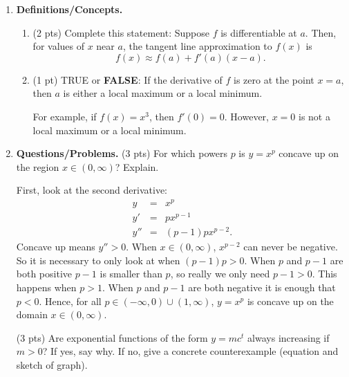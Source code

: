 \documentclass[11pt,letterpaper]{article}
\begin{document}
\begin{enumerate}
\item \textbf{Definitions/Concepts.} 
\begin{enumerate}
 \item (2 pts) Complete this statement:  Suppose $f$ is differentiable at $a$.  Then, for values of $x$ near $a$, the tangent line approximation to $f(x)$ is
\[f(x)\approx f(a)+f'(a)(x-a).\]
 
\vspace{1pc}
\item (1 pt) TRUE or \textbf{FALSE}: If the derivative of $f$ is zero at the point $x=a$, then $a$ is either a local maximum or a local minimum.

\vspace{.5pc}
For example, if $f(x)=x^3$, then $f'(0)=0$.  However, $x=0$ is not a local maximum or a local minimum.
\end{enumerate}

\vspace{1pc}
\item \textbf{Questions/Problems.} (3 pts) For which powers $p$ is $y=x^p$ concave up on the
region $x\in (0,\infty)$?  Explain.

\vspace{.5pc}
First, look at the second derivative:
\begin{eqnarray*}
 y &=& x^p \\
y' &=& px^{p-1} \\
y'' &=& (p-1)px^{p-2}.
\end{eqnarray*}
Concave up means $y''>0$.  When $x\in (0,\infty )$, $x^{p-2}$ can never be negative.  So it is necessary to only look at when $(p-1)p>0$.  When $p$ and $p-1$ are both positive $p-1$ is smaller than $p$, so really we only need $p-1>0$.  This happens when $p>1$.  When $p$ and $p-1$ are both negative it is enough that $p<0$.  Hence, for all $p\in (-\infty ,0)\cup (1,\infty )$, $y=x^p$ is concave up on the domain $x\in (0,\infty )$.

\vspace{1pc}
\noindent (3 pts) Are exponential functions of the form $y=mc^t$
always increasing if $m>0$? If yes, say why. If no, give a
concrete counterexample (equation and sketch of graph).


\end{enumerate}
\end{document}
